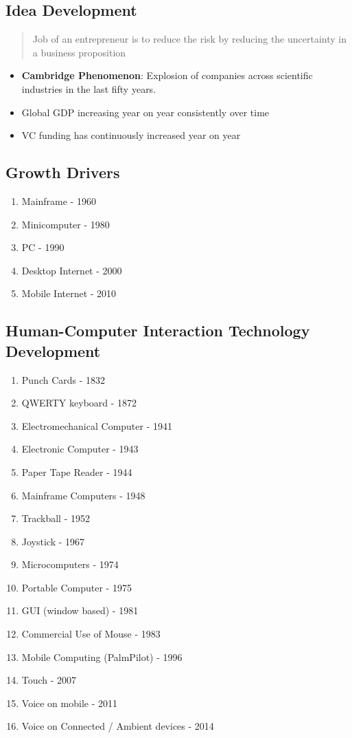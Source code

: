 \documentclass{article}
\begin{document}
\begin{multicols}{2}

\section{Idea Development}
\begin{quote}
    Job of an entrepreneur is to reduce the risk by reducing the uncertainty in a business proposition
\end{quote}

\begin{itemize}
    \item \textbf{Cambridge Phenomenon}: Explosion of companies across scientific industries in the last fifty years.
    \item Global GDP increasing year on year consistently over time
    \item VC funding has continuously increased year on year
\end{itemize}

\subsection{Growth Drivers}
\begin{enumerate}
    \item Mainframe - 1960
    \item Minicomputer - 1980
    \item PC - 1990
    \item Desktop Internet - 2000
    \item Mobile Internet - 2010
\end{enumerate}

\subsection{Human-Computer Interaction Technology Development}
\begin{enumerate}
    \item Punch Cards - 1832
    \item QWERTY keyboard - 1872
    \item Electromechanical Computer - 1941
    \item Electronic Computer - 1943
    \item Paper Tape Reader - 1944
    \item Mainframe Computers - 1948
    \item Trackball - 1952
    \item Joystick - 1967
    \item Microcomputers - 1974
    \item Portable Computer - 1975
    \item GUI (window based) - 1981
    \item Commercial Use of Mouse - 1983
    \item Mobile Computing (PalmPilot) - 1996
    \item Touch - 2007
    \item Voice on mobile - 2011
    \item Voice on Connected / Ambient devices - 2014
\end{enumerate}


\end{multicols}
\end{document}
